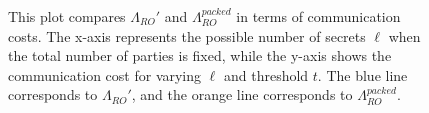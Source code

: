 \begin{figure}[t!]
  \centering
  \caption{This plot compares $\Lambda_{RO}'$ and $\Lambda_{RO}^{packed}$ in terms of communication costs. 
  The x-axis represents the possible number of secrets $\ell$ when the total number of parties 
  is fixed, while the y-axis shows the communication cost for varying $\ell$ and threshold $t$. 
  The blue line corresponds to $\Lambda_{RO}'$, and the orange line corresponds to $\Lambda_{RO}^{packed}$.}
  \label{fig:3pvss_communication_cost}
\end{figure}